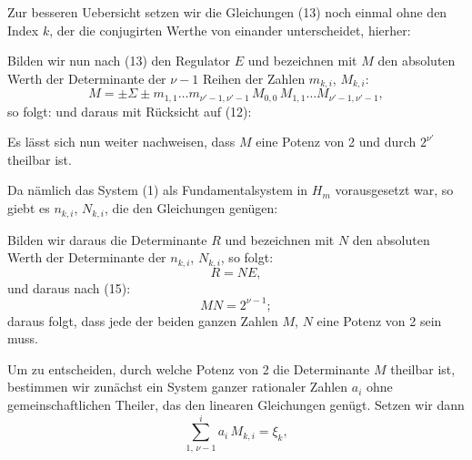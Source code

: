 
Zur besseren Uebersicht setzen wir die Gleichungen (13)
noch einmal ohne den Index $k$, der die conjugirten Werthe von
einander unterscheidet, hierher:

Bilden wir nun nach (13) den Regulator $E$ und bezeichnen
mit $M$ den absoluten Werth der Determinante der $\nu-1$ Reihen
der Zahlen $m_{k,i}$, $M_{k,i}$:
\[
M = \pm \Sigma \pm m_{1,1} \ldots m_{\nu'-1,\nu'-1}\, M_{0,0}\, M_{1,1} \ldots M_{\nu'-1,\nu'-1},
\]
so folgt:
und daraus mit Rücksicht auf (12):

Es lässt sich nun weiter nachweisen, dass $M$ eine Potenz
von 2 und durch $2^{\nu'}$ theilbar ist.

Da nämlich das System (1) als Fundamentalsystem in $H_m$
vorausgesetzt war, so giebt es 
$n_{k,i}$, $N_{k,i}$, die den Gleichungen genügen:

Bilden wir daraus die Determinante $R$ und bezeichnen mit $N$
den absoluten Werth der Determinante der $n_{k,i}$, $N_{k,i}$, so folgt:
\[
R = N E,
\]
und daraus nach (15):
\[
M N = 2^{\nu-1};
\]
daraus folgt, dass jede der beiden ganzen Zahlen $M$, $N$ eine
Potenz von 2 sein muss.

Um zu entscheiden, durch welche Potenz von 2 die Determinante
 $M$ theilbar ist, bestimmen wir zunächst ein System
ganzer rationaler Zahlen $a_i$ ohne gemeinschaftlichen Theiler, das
den linearen Gleichungen
genügt. Setzen wir dann
\[
\sum\limits_{1,\, \nu-1}^{i} a_i\, M_{k,i} = \xi_k,
\]

